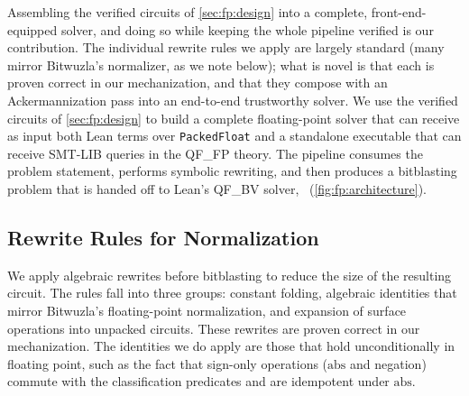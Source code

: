 Assembling the verified circuits of \cref{sec:fp:design} into a complete,
front-end-equipped solver, and doing so while keeping the whole pipeline verified is our contribution.
The individual rewrite rules we apply are largely standard (many mirror Bitwuzla's normalizer, as we note below); what is novel is that each is proven correct in our mechanization, and that they compose with an Ackermannization pass into an end-to-end trustworthy solver.
We use the verified circuits of \cref{sec:fp:design} to build a complete floating-point solver
that can receive as input both Lean terms over \texttt{PackedFloat}
and a standalone executable that can receive SMT-LIB queries in the QF\_FP theory.
The pipeline consumes the problem statement, performs symbolic rewriting, and then produces
a bitblasting problem that is handed off to Lean's QF\_BV solver, \bvdecide{}~(\cref{fig:fp:architecture}).


\subsection{Rewrite Rules for Normalization}


We apply algebraic rewrites before bitblasting
to reduce the size of the resulting circuit.
The rules fall into three groups: constant folding, algebraic identities that mirror Bitwuzla's floating-point normalization,
and expansion of surface operations into unpacked circuits. These rewrites are proven correct in our mechanization.
The identities we do apply are those that hold unconditionally in floating point,
such as the fact that sign-only operations ($\mathrm{abs}$ and negation) commute
with the classification predicates and are idempotent under $\mathrm{abs}$.

